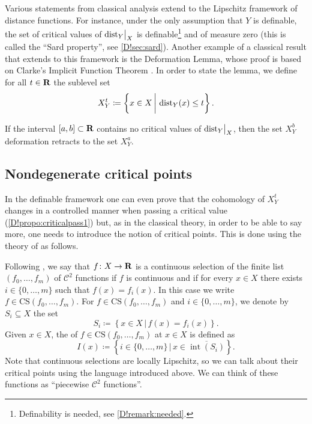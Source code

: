 Various statements from classical analysis extend to the Lipschitz framework of distance functions. For instance, under the only assumption that $Y$ is definable, the set of critical values of $\mathord{\operatorname{dist}}_Y\big|_X$ is definable\footnote{Definability is needed, see \cref{D!remark:needed}.} and of measure zero (this is called the ``Sard property'', see \cref{D!sec:sard}). Another example of a classical result that extends to this framework is the Deformation Lemma, whose proof is based on Clarke's Implicit Function Theorem \cite{Clarke}. In order to state the lemma, we define for all $t \in \mathbf{R}$ the sublevel set
\[
  X_Y^t \coloneq \left\{ x\in X \,\bigg|\, \operatorname{dist}_Y(x)\leq t \right\}.
\]

\begin{proposition}
  If the interval $[a,b] \subset \mathbf{R}$ contains no critical values of $\mathord{\operatorname{dist}}_Y\big|_X$, then the set $X_Y^b$ deformation retracts to the set $X_Y^a$.
\end{proposition}

\subsection{Nondegenerate critical points}

In the definable framework one can even prove that the cohomology of $X_Y^t$ changes in a controlled manner when passing a critical value (\cref{D!propo:criticalpass1}) but, as in the classical theory, in order to be able to say more, one needs to introduce the notion of  critical points. This is done using the theory of  as follows.

Following \cite{APS1997}, we say that $f \colon X \to \mathbf{R}$ is a continuous selection of the finite list $(f_0, \ldots, f_m)$ of $\mathcal{C}^2$ functions  if $f$ is continuous and if for every $x \in X$ there exists $i \in \{0, \ldots, m\}$ such that $f(x) = f_i(x)$. In this case we write $f \in \mathrm{CS}(f_0, \ldots, f_m)$. For $f \in \mathrm{CS}(f_0, \ldots, f_m)$ and $i \in \{0, \ldots, m\}$, we denote by $S_i \subseteq X$ the set
\[
  S_i \coloneq \left\{ x\in X \,\bigg|\, f(x) = f_i(x) \right\}.
\]
Given $x \in X$, the  of $f\in \mathrm{CS}(f_0, \ldots, f_m)$ at $x\in X$ is defined as
\[
  I(x)\coloneq \left\{ i\in \{0, \ldots, m\} \,\bigg|\, x \in
  \overline{\operatorname{int}(S_i)}
  \right\}.
\]
Note that continuous selections are locally Lipschitz, so we can talk about their critical points using the language introduced above. We can think of these functions as ``piecewise $\mathcal{C}^2$ functions''.

